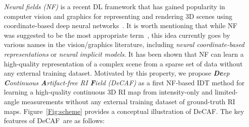 \documentclass[11pt]{article}
\theoremstyle{plain} %
\def\proposed{DeCAF}
\begin{document}
\emph{Neural fields (NF)} is a recent DL framework that has gained popularity in computer vision and graphics for representing and rendering 3D scenes using coordinate-based deep neural networks~\cite{Sitzmann.etal2019a,Sitzmann.etal2019}. It is worth mentioning that while NF was suggested to be the most appropriate term~\cite{Hinton2021, Piala.Clarck2021}, this idea currently goes by various names in the vision/graphics literature, including \emph{neural coordinate-based representations} or \emph{neural implicit models}. It has been shown that NF can learn a high-quality representation of a complex scene from a sparse set of data without any external training dataset. Motivated by this property, we propose \emph{\textbf{De}ep \textbf{C}ontinuous \textbf{A}rtifact-free RI \textbf{F}ield (\proposed)} as a first NF-based IDT method for learning a high-quality continuous 3D RI map from intensity-only and limited-angle measurements without any external training dataset of ground-truth RI maps. Figure~\ref{Fig:scheme} provides a conceptual illustration of \proposed. The key features of \proposed~are as follows:
\end{document}
